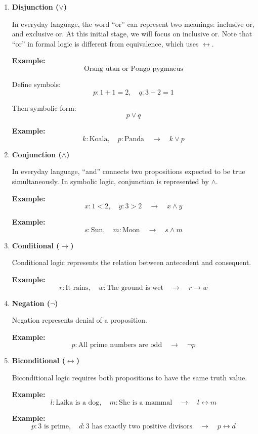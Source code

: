 \documentclass[12pt,a4paper,openany]{article}
\begin{document}
\begin{enumerate}
\item
\textbf{Disjunction (\(\lor\))}

In everyday language, the word ``or'' can represent two meanings:
inclusive or, and exclusive or. At this initial stage, we will focus
on inclusive or. Note that ``or'' in formal logic is different from
equivalence, which uses \(\leftrightarrow\).

\textbf{Example:}
\[
\text{Orang utan or Pongo pygmaeus}
\]

Define symbols:
\[
p: 1 + 1 = 2, \quad q: 3 - 2 = 1
\]

Then symbolic form:
\[
p \lor q
\]

\textbf{Example:}
\[
k: \text{Koala}, \quad p: \text{Panda} \quad \to \quad k \lor p
\]

\item
\textbf{Conjunction (\(\land\))}

In everyday language, ``and'' connects two propositions expected to be
true simultaneously. In symbolic logic, conjunction is represented by \(\land\).

\textbf{Example:}
\[
x: 1<2, \quad y: 3>2 \quad \to \quad x \land y
\]

\textbf{Example:}
\[
s: \text{Sun}, \quad m: \text{Moon} \quad \to \quad s \land m
\]

\item
\textbf{Conditional (\(\to\))}

Conditional logic represents the relation between antecedent and
consequent.

\textbf{Example:}
\[
r: \text{It rains}, \quad w: \text{The ground is wet} \quad \to \quad r \to w
\]

\item
\textbf{Negation (\(\neg\))}

Negation represents denial of a proposition.

\textbf{Example:}
\[
p: \text{All prime numbers are odd} \quad \to \quad \neg p
\]

\item
\textbf{Biconditional (\(\leftrightarrow\))}

Biconditional logic requires both propositions to have the same truth value.

\textbf{Example:}
\[
l: \text{Laika is a dog}, \quad m: \text{She is a mammal} \quad \to \quad l \leftrightarrow m
\]

\textbf{Example:}
\[
p: 3 \text{ is prime}, \quad d: 3 \text{ has exactly two positive divisors} \quad \to \quad p \leftrightarrow d
\]

\end{enumerate}
\end{document}
